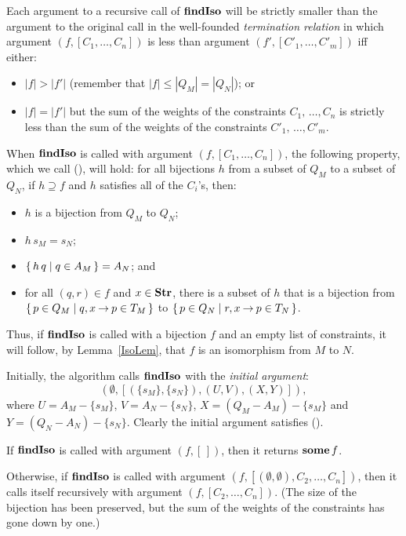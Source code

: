 Each argument to a recursive call of $\mathbf{findIso}$ will be strictly
smaller than the argument to the original call in the well-founded
\emph{termination relation} in which argument $(f, [C_1,\ldots,C_n])$
is less than argument $(f', [C'_1,\ldots,C'_m])$ iff either:
\begin{itemize}
\item $|f|>|f'|$ (remember that $|f|\leq|Q_M|=|Q_N|$); or

\item $|f|=|f'|$ but the sum of the weights of the constraints
  $C_1,\,\ldots,C_n$ is strictly less than the sum of the weights of
  the constraints $C'_1, \,\ldots,C'_m$.
\end{itemize}

When $\mathbf{findIso}$ is called with argument $(f, [C_1,\ldots,C_n])$, the
following property, which we call (\dag), will hold: for all bijections
$h$ from a subset of $Q_M$ to a subset of $Q_N$, if $h\supseteq f$ and $h$
satisfies all of the $C_i$'s, then:
\begin{itemize}
\item $h$ is a bijection from $Q_M$ to $Q_N$;

\item $h\,s_M = s_N$;

\item $\{ \, h\,q \mid q\in A_M \, \} = A_N$; and

\item for all $(q, r)\in f$ and $x\in\mathbf{Str}$, there is a subset of $h$
  that is a bijection from $\{ \, p\in Q_M \mid q,x\mathbin{\to} p\in T_M \, \}$ to
  $\{ \, p\in Q_N \mid r,x\mathbin{\to} p\in T_N \, \}$.
\end{itemize}
Thus, if $\mathbf{findIso}$ is called with a bijection $f$ and an empty list
of constraints, it will follow, by Lemma~\ref{IsoLem},
that $f$ is an isomorphism from $M$ to $N$.

Initially, the algorithm calls $\mathbf{findIso}$ with the \emph{initial argument}:
\begin{displaymath}
(\emptyset, [(\{s_M\}, \{s_N\}), (U, V), (X, Y)]) ,
\end{displaymath}
where $U = A_M - \{s_M\}$, $V = A_N - \{s_N\}$, $X = (Q_M - A_M) -
\{s_M\}$ and $Y= (Q_N - A_N) - \{s_N\}$. Clearly the initial
argument satisfies (\dag).

If $\mathbf{findIso}$ is called with argument $(f, [\,])$, then it returns
$\mathbf{some}\,f$.

Otherwise, if $\mathbf{findIso}$ is called with argument $(f, [(\emptyset,
\emptyset), C_2, \ldots, C_n])$, then it calls itself recursively with
argument $(f, [C_2, \ldots, C_n])$.  (The size of the bijection has
been preserved, but the sum of the weights of the constraints has gone
down by one.)

